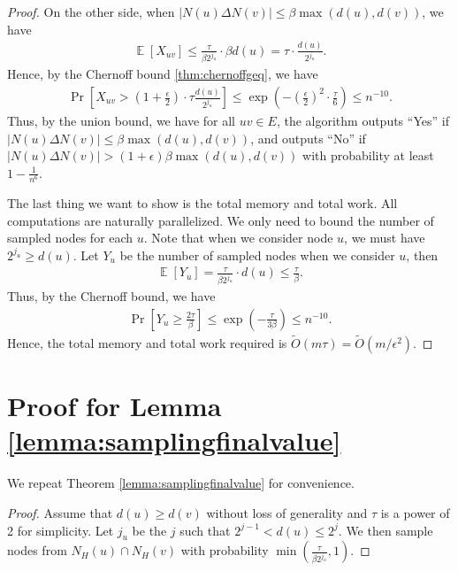\documentclass[11pt]{article}
\DeclareMathOperator*{\E}{{\mathbb{E}}}
\begin{document}
\begin{CJK*}{UTF8}{gbsn}
\begin{proof}
On the other side, when $|N(u) \Delta N(v)| \leq \beta \max(d(u), d(v))$, we have 
\begin{align*}
    \E[X_{uv}] \leq \frac{\tau}{\beta 2^{j_u}} \cdot \beta d(u) = \tau \cdot \frac{d(u)}{2^{j_u}}.
\end{align*}
Hence, by the Chernoff bound \ref{thm:chernoffgeq}, we have 
\begin{align*}
    \Pr[X_{uv} > (1 + \frac{\epsilon}{2}) \cdot \tau \frac{d(u)}{2^{j_u}}] \leq \exp\left(-\left(\frac{\epsilon}{2}\right)^2 \cdot \frac{\tau}{6}\right) \leq n^{-10}.
\end{align*}
Thus, by the union bound, we have for all $uv \in E$, the algorithm outputs “Yes” if $|N(u) \Delta N(v)| \leq \beta \max(d(u), d(v))$, and outputs “No” if $|N(u) \Delta N(v)| > (1 + \epsilon) \beta \max(d(u), d(v))$ with probability at least $1 - \frac{1}{n^6}$.

The last thing we want to show is the total memory and total work. All computations are naturally parallelized. We only need to bound the number of sampled nodes for each $u$. Note that when we consider node $u$, we must have $2^{j_u} \geq d(u)$. Let $Y_u$ be the number of sampled nodes when we consider $u$, then 
\begin{align*}
    \E[Y_u] = \frac{\tau}{\beta 2^{j_u}} \cdot d(u) \leq \frac{\tau}{\beta}.
\end{align*}
Thus, by the Chernoff bound, we have 
\begin{align*}
    \Pr[Y_u \geq \frac{2\tau}{\beta}] \leq \exp\left(-\frac{\tau}{3\beta}\right) \leq n^{-10}.
\end{align*}
Hence, the total memory and total work required is $\tilde{O}(m \tau) = \tilde{O}(m / \epsilon^2)$.













\end{proof} 
\section{Proof for Lemma \ref{lemma:samplingfinalvalue}}
\label{sec:proofofsamplingfinalvalue}
We repeat Theorem \ref{lemma:samplingfinalvalue} for convenience.
\lemmasmpaling*

\begin{proof}

Assume that $d(u) \geq d(v)$ without loss of generality and $\tau$ is a power of 2 for simplicity. Let $j_u$ be the $j$ such that $2^{j-1} < d(u) \leq 2^j$. We then sample nodes from $N_H(u) \cap N_H(v)$ with probability $\min(\frac{\tau}{\beta 2^{j_u}}, 1)$. 


\end{proof}
\end{CJK*}
\end{document}
